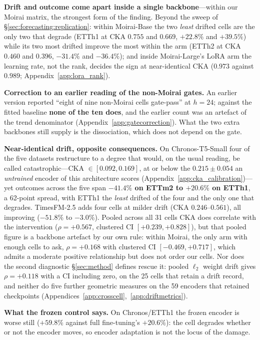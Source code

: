 \textbf{Drift and outcome come apart inside a single backbone}---within our
Moirai matrix, the strongest form of the finding.  Beyond the sweep of
\S\ref{sec:forecasting:replication}: within Moirai-Base the two \emph{least}
drifted cells are the only two that degrade (ETTh1 at CKA $0.755$ and $0.669$,
$+22.8\%$ and $+39.5\%$) while its two most drifted improve the most within the
arm (ETTh2 at CKA $0.460$ and $0.396$, $-31.4\%$ and $-36.4\%$); and inside
Moirai-Large's LoRA arm the learning rate, not the rank, decides the sign at
near-identical CKA ($0.973$ against $0.989$; Appendix~\ref{app:lora_rank}).

\textbf{Correction to an earlier reading of the non-Moirai gates.} An earlier
version reported ``eight of nine non-Moirai cells gate-pass'' at $h{=}24$;
against the fitted baseline \textbf{none of the ten does}, and the earlier count
was an artefact of the trend denominator (Appendix~\ref{app:gatecorrection}).
What the two extra backbones still supply is the dissociation, which does not
depend on the gate.

\textbf{Near-identical drift, opposite consequences.} On Chronos-T5-Small four
of the five datasets restructure to a degree that would, on the usual reading,
be called catastrophic---CKA ${\in}[0.092, 0.169]$, at or below the
$0.215{\pm}0.054$ an \emph{untrained} encoder of this architecture scores
(Appendix~\ref{app:cka_calibration})---yet outcomes across the five span \textbf{$-41.4\%$ on
ETTm2 to $+20.6\%$ on ETTh1}, a 62-point spread, with ETTh1 the \emph{least}
drifted of the four and the only one that degrades.  TimesFM-2.5 adds four
cells at milder drift (CKA $0.246$--$0.561$), all improving ($-51.8\%$ to
$-3.0\%$).  Pooled across all 31 cells CKA does correlate with the intervention
($\rho{=}{+}0.567$, clustered CI $[{+}0.239,{+}0.828]$), but that pooled figure is a
backbone artefact by our own rule: within Moirai, the only arm with enough
cells to ask, $\rho{=}{+}0.168$ with clustered CI $[-0.469,{+}0.717]$, which admits a
moderate positive relationship but does not order our cells.  Nor does the
second diagnostic \S\ref{sec:method} defines rescue it: pooled $\ell_2$ weight
drift gives $\rho{=}{+}0.118$ with a CI including zero, on the 25 cells that
retain a drift record, and neither do five further geometric measures on the 59
encoders that retained checkpoints
(Appendices~\ref{app:crosscell},~\ref{app:driftmetrics}).

\textbf{What the frozen control says.} On Chronos/ETTh1 the frozen encoder is
worse still ($+59.8\%$ against full fine-tuning's $+20.6\%$): the cell degrades
whether or not the encoder moves, so encoder adaptation is not the locus of the
damage.

